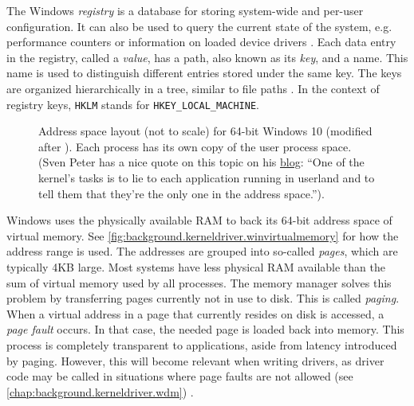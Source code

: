 The Windows \emph{registry} is a database for storing system-wide and per-user configuration. It can also be used to query the current state of the system, e.g. performance counters or information on loaded device drivers \cite{Yosifovich2017}. Each data entry in the registry, called a \emph{value}, has a path, also known as its \emph{key}, and a name. This name is used to distinguish different entries stored under the same key. The keys are organized hierarchically in a tree, similar to file paths \cite{Win32}. In the context of registry keys, \texttt{HKLM} stands for \texttt{HKEY\_LOCAL\_MACHINE}.

\begin{figure}[htb!]
	\center
	\caption[
		Address space layout for 64-bit Windows 10.
	]{
		Address space layout (not to scale) for 64-bit Windows 10 (modified after \cite{Yosifovich2017}). %
		Each process has its own copy of the user process space.\\
		(Sven Peter has a nice quote on this topic on his \href{https://blog.svenpeter.dev/posts/m1_sprr_gxf/}{blog}: ``One of the kernel's tasks is to lie to each application running in userland and to tell them that they're the only one in the address space.'').
	}
	\label{fig:background.kerneldriver.winvirtualmemory}
\end{figure}

Windows uses the physically available RAM to back its 64-bit address space of virtual memory. See \autoref{fig:background.kerneldriver.winvirtualmemory} for how the address range is used. The addresses are grouped into so-called \emph{pages}, which are typically 4KB large. Most systems have less physical RAM available than the sum of virtual memory used by all processes. The memory manager solves this problem by transferring pages currently not in use to disk. This is called \emph{paging}. When a virtual address in a page that currently resides on disk is accessed, a \emph{page fault} occurs. In that case, the needed page is loaded back into memory. This process is completely transparent to applications, aside from latency introduced by paging. However, this will become relevant when writing drivers, as driver code may be called in situations where page faults are not allowed (see \autoref{chap:background.kerneldriver.wdm}) \cite{Yosifovich2017}.

